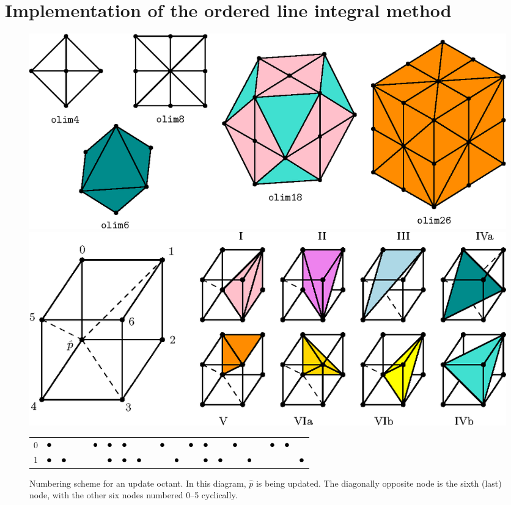 \documentclass[eikonal.tex]{subfiles}
\begin{document}
  
\section{Implementation of the ordered line integral
  method}\label{sec:implementation}

\begin{figure}
  \centering
  \includegraphics{neighborhoods.eps}
  \caption{Ordered line integral method neighborhoods in 2D and 3D:
    \texttt{olim4} and \texttt{olim8} are 2D solvers and the rest are
    3D solvers. The color coding of tetrahedron updates is the same
    for this figure and \cref{fig:octant-numbering}
    below.}\label{fig:neighborhoods}%
  \vspace{-1.5em}
  \includegraphics{simplex-groups.eps}
  \caption{Numbering scheme for an update octant. In this diagram,
    $\hat{p}$ is being updated. The diagonally opposite node is the
    sixth (last) node, with the other six nodes numbered 0--5
    cyclically.}\label{fig:octant-numbering}
  {
    \footnotesize
    \begin{tabular}{c|cccccc|cccccc|cccccc|cc}
      0 & $\groupmarker$ & & & & $\groupmarker$ & $\groupmarker$ & $\groupmarker$ & & & $\groupmarker$ & & $\groupmarker$ & $\groupmarker$ & & $\groupmarker$ & & & $\groupmarker$ & $\groupmarker$ & \\
      1 & $\groupmarker$ & $\groupmarker$ & & & & $\groupmarker$ & $\groupmarker$ & $\groupmarker$ & & & $\groupmarker$ & & $\groupmarker$ & $\groupmarker$ & & $\groupmarker$ & & & & $\groupmarker$ \\

\end{tabular}}
\end{figure}
\end{document}
